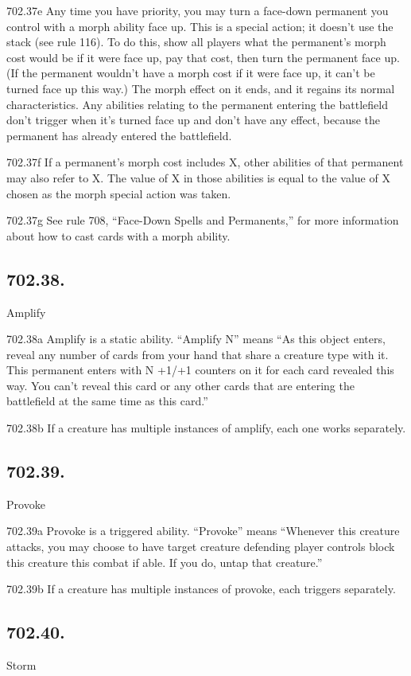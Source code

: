 702.37e Any time you have priority, you may turn a face-down permanent you control with a morph ability face up. This is a special action; it doesn’t use the stack (see rule 116). To do this, show all players what the permanent’s morph cost would be if it were face up, pay that cost, then turn the permanent face up. (If the permanent wouldn’t have a morph cost if it were face up, it can’t be turned face up this way.) The morph effect on it ends, and it regains its normal characteristics. Any abilities relating to the permanent entering the battlefield don’t trigger when it’s turned face up and don’t have any effect, because the permanent has already entered the battlefield.

702.37f If a permanent’s morph cost includes X, other abilities of that permanent may also refer to X. The value of X in those abilities is equal to the value of X chosen as the morph special action was taken.

702.37g See rule 708, “Face-Down Spells and Permanents,” for more information about how to cast cards with a morph ability.

\subsection*{702.38.}
Amplify

702.38a Amplify is a static ability. “Amplify N” means “As this object enters, reveal any number of cards from your hand that share a creature type with it. This permanent enters with N +1/+1 counters on it for each card revealed this way. You can’t reveal this card or any other cards that are entering the battlefield at the same time as this card.”

702.38b If a creature has multiple instances of amplify, each one works separately.

\subsection*{702.39.}
Provoke

702.39a Provoke is a triggered ability. “Provoke” means “Whenever this creature attacks, you may choose to have target creature defending player controls block this creature this combat if able. If you do, untap that creature.”

702.39b If a creature has multiple instances of provoke, each triggers separately.

\subsection*{702.40.}
Storm


